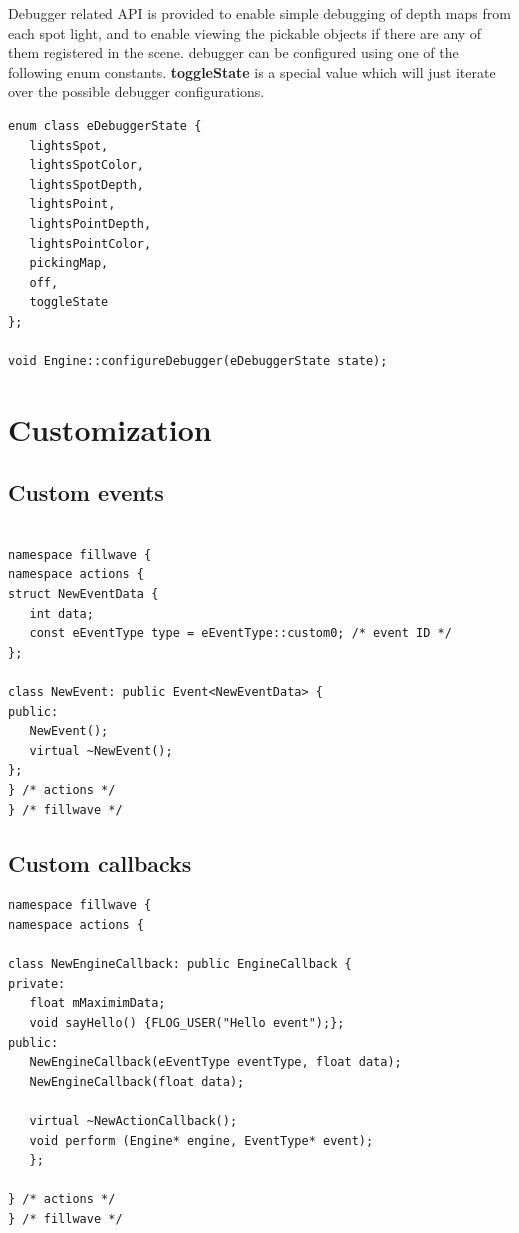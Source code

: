 \documentclass{article}
\begin{document}
\indent \indent Debugger related API is provided to enable simple debugging of depth maps from each spot light, and to enable viewing the pickable objects if there are any of them registered in the scene. debugger can be configured using one of the following enum constants. \textbf{toggleState} is a special value which will just iterate over the possible debugger configurations.

\begin{lstlisting}
enum class eDebuggerState {
   lightsSpot,
   lightsSpotColor,
   lightsSpotDepth,
   lightsPoint,
   lightsPointDepth,
   lightsPointColor,
   pickingMap,
   off,
   toggleState
};

void Engine::configureDebugger(eDebuggerState state);
\end{lstlisting}

\newpage

\section{Customization}

\subsection{Custom events}\label{sec:Custom events}
\begin{lstlisting}

namespace fillwave {
namespace actions {
struct NewEventData {
   int data;
   const eEventType type = eEventType::custom0; /* event ID */
};

class NewEvent: public Event<NewEventData> {
public:
   NewEvent();
   virtual ~NewEvent();
};
} /* actions */
} /* fillwave */
\end{lstlisting}
\subsection{Custom callbacks}\label{sec:Custom callbacks}
\begin{lstlisting}
namespace fillwave {
namespace actions {

class NewEngineCallback: public EngineCallback {
private:
   float mMaximimData;
   void sayHello() {FLOG_USER("Hello event");};
public:
   NewEngineCallback(eEventType eventType, float data);
   NewEngineCallback(float data);

   virtual ~NewActionCallback();
   void perform (Engine* engine, EventType* event);
   };

} /* actions */
} /* fillwave */
\end{lstlisting}
\end{document}
